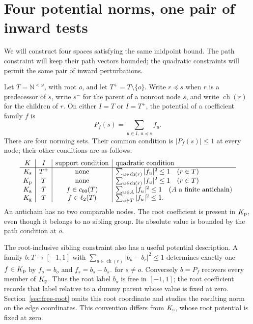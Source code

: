 \section{Four potential norms, one pair of inward tests}\label{sec:coefficient-tests}

We will construct four spaces satisfying the same midpoint bound. The
path constraint will keep their path vectors bounded; the quadratic
constraints will permit the same pair of inward perturbations.

Let $T=\mathbb N^{<\omega}$, with root $o$, and let $T^+=T\setminus\{o\}$.
Write $r\preceq s$ when $r$ is a predecessor of $s$, write $s^-$ for
the parent of a nonroot node $s$, and write $\operatorname{ch}(r)$ for
the children of $r$. On either $I=T$ or
$I=T^+$, the potential of a coefficient family $f$ is
\[
 P_f(s)=\sum_{u\in I,\ u\preceq s}f_u.
\]
There are four norming sets. Their common condition is
$|P_f(s)|\le1$ at every node; their other conditions are as follows:
\[
\begin{array}{c|c|c|l}
 K&I&\text{support condition}&\text{quadratic condition}\\ \hline
 K_{\rm s}&T^+&\text{none}&
       \sum_{u\in\operatorname{ch}(r)}|f_u|^2\le1\quad(r\in T)\\
 K_{\rm p}&T&\text{none}&
       \sum_{u\in\operatorname{ch}(r)}|f_u|^2\le1\quad(r\in T)\\
 K_{\rm a}&T&f\in c_{00}(T)&
       \sum_{u\in A}|f_u|^2\le1\quad(A\text{ a finite antichain})\\
 K_{\rm g}&T&f\in\ell_2(T)&
       \sum_{u\in T}|f_u|^2\le1.
\end{array}
\]
An antichain has no two comparable nodes. The root coefficient is
present in $K_{\rm p}$, even though it belongs to no sibling group.
Its absolute value is bounded by the path condition at $o$.


The root-inclusive sibling constraint also has a useful potential description.
A family $b:T\to[-1,1]$ with
$\sum_{u\in\operatorname{ch}(r)}|b_u-b_r|^2\le1$ determines exactly one
$f\in K_{\rm p}$ by $f_o=b_o$ and $f_s=b_s-b_{s^-}$ for $s\ne o$.
Conversely $b=P_f$ recovers every member of $K_{\rm p}$.
Thus the root label $b_o$ is free in $[-1,1]$; the root coefficient
records that label relative to a dummy parent whose value is fixed at
zero. Section~\ref{sec:free-root} omits this root coordinate and studies
the resulting norm on the edge coordinates. This convention differs
from $K_{\rm s}$, whose root potential is fixed at zero.

